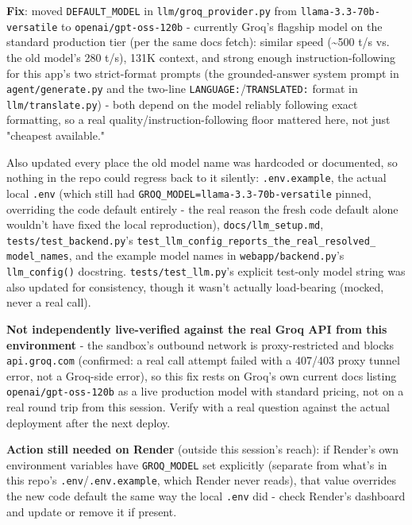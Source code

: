 \textbf{Fix}: moved \texttt{DEFAULT\_\allowbreak{}MODEL} in \texttt{llm/\allowbreak{}groq\_\allowbreak{}provider.py} from \texttt{llama-3.3-70b-versatile} to \texttt{openai/\allowbreak{}gpt-oss-120b} - currently Groq's flagship model on the standard production tier (per the same docs fetch): similar speed (\textasciitilde{}500 t/s vs. the old model's 280 t/s), 131K context, and strong enough instruction-following for this app's two strict-format prompts (the grounded-answer system prompt in \texttt{agent/\allowbreak{}generate.py} and the two-line \texttt{LANGUAGE:}/\texttt{TRANSLATED:} format in \texttt{llm/\allowbreak{}translate.py}) - both depend on the model reliably following exact formatting, so a real quality/instruction-following floor mattered here, not just "cheapest available."

Also updated every place the old model name was hardcoded or documented, so nothing in the repo could regress back to it silently: \texttt{.env.example}, the actual local \texttt{.env} (which still had \texttt{GROQ\_\allowbreak{}MODEL=llama-3.3-70b-versatile} pinned, overriding the code default entirely - the real reason the fresh code default alone wouldn't have fixed the local reproduction), \texttt{docs/\allowbreak{}llm\_\allowbreak{}setup.md}, \texttt{tests/\allowbreak{}test\_\allowbreak{}backend.py}'s \texttt{test\_\allowbreak{}llm\_\allowbreak{}config\_\allowbreak{}reports\_\allowbreak{}the\_\allowbreak{}real\_\allowbreak{}resolved\_\allowbreak{} model\_\allowbreak{}names}, and the example model names in \texttt{webapp/\allowbreak{}backend.py}'s \texttt{llm\_\allowbreak{}config()} docstring. \texttt{tests/\allowbreak{}test\_\allowbreak{}llm.py}'s explicit test-only model string was also updated for consistency, though it wasn't actually load-bearing (mocked, never a real call).

\textbf{Not independently live-verified against the real Groq API from this environment} - the sandbox's outbound network is proxy-restricted and blocks \texttt{api.groq.com} (confirmed: a real call attempt failed with a 407/403 proxy tunnel error, not a Groq-side error), so this fix rests on Groq's own current docs listing \texttt{openai/\allowbreak{}gpt-oss-120b} as a live production model with standard pricing, not on a real round trip from this session. Verify with a real question against the actual deployment after the next deploy.

\textbf{Action still needed on Render} (outside this session's reach): if Render's own environment variables have \texttt{GROQ\_\allowbreak{}MODEL} set explicitly (separate from what's in this repo's \texttt{.env}/\texttt{.env.example}, which Render never reads), that value overrides the new code default the same way the local \texttt{.env} did - check Render's dashboard and update or remove it if present.

